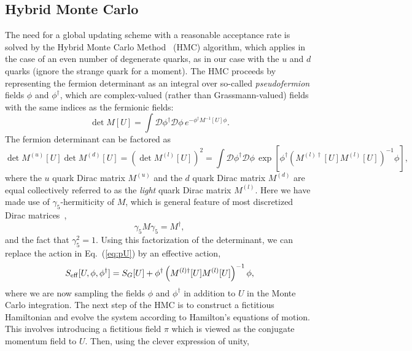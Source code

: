 \subsection{Hybrid Monte Carlo}
The need for a global updating scheme with a reasonable acceptance rate is solved by the Hybrid Monte Carlo Method~\cite{Kennedy:1987vx} (HMC) algorithm, which applies in the case of an even number of degenerate quarks, as in our case with the $u$ and $d$ quarks (ignore the strange quark for a moment). The HMC proceeds by representing the fermion determinant as an integral over so-called \emph{pseudofermion} fields $\phi$ and $\phi^\dagger$, which are complex-valued (rather than Grassmann-valued) fields with the same indices as the fermionic fields:
\begin{equation}
    \operatorname{det} M[U]=\int \mathcal{D}\phi^{\dagger} \mathcal{D}\phi\,e^{-\phi^{\dagger} M^{-1}[U] \phi}.
\end{equation}
The fermion determinant can be factored as
\begin{equation}
    \operatorname{det} M^{(u)}[U] \operatorname{det} M^{(d)}[U]=\left(\operatorname{det} M^{(l)}[U]\right)^{2}=\int \mathcal{D} \phi^\dagger \mathcal{D}\phi\,\exp \left[\phi^{\dagger}\left(M^{(l) \dagger}[U] M^{(l)}[U]\right)^{-1} \phi\right],
\end{equation}
where the $u$ quark Dirac matrix $M^{(u)}$ and the $d$ quark Dirac matrix $M^{(d)}$ are equal collectively referred to as the \emph{light} quark Dirac matrix $M^{(l)}$. Here we have made use of $\gamma_5$-hermiticity of $M$, which is general feature of most discretized Dirac matrices~\cite{Gattringer:2010zz},
\begin{equation}
    \gamma_5 M \gamma_5 = M^\dagger,
\end{equation}
and the fact that $\gamma_5^2=1$. Using this factorization of the determinant, we can replace the action in Eq.~(\ref{eq:pU}) by an effective action,
\begin{equation}
    S_{\rm{eff}}[U,\phi,\phi^\dagger] = S_G[U] + \phi^\dagger\left(M^{(l)\dagger}[U]M^{(l)}[U]\right)^{-1}\phi,
\end{equation}
where we are now sampling the fields $\phi$ and $\phi^\dagger$ in addition to $U$ in the Monte Carlo integration. The next step of the HMC is to construct a fictitious Hamiltonian and evolve the system according to Hamilton's equations of motion. This involves introducing a fictitious field $\pi$ which is viewed as the conjugate momentum field to $U$. Then, using the clever expression of unity,
